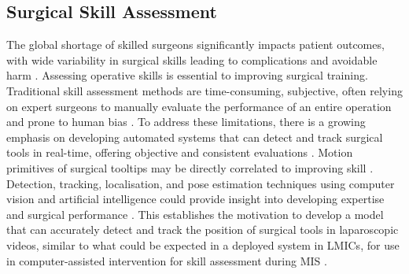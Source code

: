 
\subsection{Surgical Skill Assessment}

The global shortage of skilled surgeons significantly impacts patient outcomes, with wide variability in surgical skills leading to complications and avoidable harm \cite{jin_tool_2018}. Assessing operative skills is essential to improving surgical training. Traditional skill assessment methods are time-consuming, subjective, often relying on expert surgeons to manually evaluate the performance of an entire operation and prone to human bias \cite{vassiliou_global_2005, paley_crowdsourced_2021, levin_automated_2019}. To address these limitations, there is a growing emphasis on developing automated systems that can detect and track surgical tools in real-time, offering objective and consistent evaluations \cite{loza_realtime_2024}. Motion primitives of surgical tooltips may be directly correlated to improving skill \cite{retrosi_motion_2015}. Detection, tracking, localisation, and pose estimation techniques using computer vision and artificial intelligence could provide insight into developing expertise and surgical performance \cite{bodenstedt_comparative_2018, allan_toward_2013, constable_enhancing_2024}. This establishes the motivation to develop a model that can accurately detect and track the position of surgical tools in laparoscopic videos, similar to what could be expected in a deployed system in LMICs, for use in computer-assisted intervention for skill assessment during MIS \cite{nwoye_cholectrack20_2023}. 

